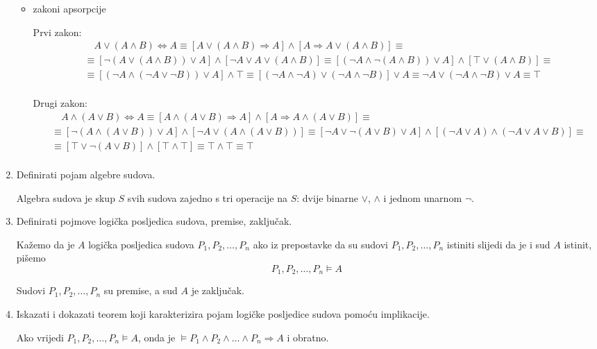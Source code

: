 \documentclass{article}
\begin{document}
\begin{enumerate}
\begin{itemize}
\item zakoni apsorpcije

Prvi zakon:
\begin{align*}
&\quad A\lor(A\land B)\Leftrightarrow A\equiv[A\lor(A\land B)\Rightarrow A]\land[A\Rightarrow A\lor(A\land B)]\equiv\\
&\equiv[\neg(A\lor(A\land B))\lor A]\land[\neg A\lor A\lor (A\land B)]\equiv[(\neg A\land\neg(A\land B))\lor A]\land[\top\lor(A\land B)]\equiv\\
&\equiv[(\neg A\land(\neg A\lor\neg B))\lor A]\land\top\equiv [(\neg A\land\neg A)\lor(\neg A\land\neg B)]\lor A\equiv\neg A\lor(\neg A\land\neg B)\lor A\equiv\top\\
\end{align*}

Drugi zakon:
\begin{align*}
&\quad A\land(A\lor B)\Leftrightarrow A\equiv[A\land(A\lor B)\Rightarrow A]\land[A\Rightarrow A\land(A\lor B)]\equiv\\
&\equiv[\neg(A\land(A\lor B))\lor A]\land[\neg A\lor (A\land (A\lor B))]\equiv[\neg A\lor\neg(A\lor B)\lor A]\land[(\neg A\lor A)\land(\neg A\lor A\lor B)]\equiv\\
&\equiv[\top\lor\neg(A\lor B)]\land[\top\land\top]\equiv\top\land\top\equiv\top\\
\end{align*}

\end{itemize}

\item Definirati pojam algebre sudova.

Algebra sudova je skup $S$ svih sudova zajedno s tri operacije na $S$: dvije binarne $\lor$, $\land$ i jednom unarnom $\neg$.

\item Definirati pojmove logička posljedica sudova, premise, zaključak.

Kažemo da je $A$ logička posljedica sudova $P_1, P_2, \ldots, P_n$ ako iz prepostavke da su sudovi $P_1, P_2, \ldots, P_n$ istiniti slijedi da je i sud $A$ istinit, pišemo
$$P_1, P_2, \ldots, P_n\vDash A$$

Sudovi $P_1, P_2, \ldots, P_n$ su premise, a sud $A$ je zaključak.

\item Iskazati i dokazati teorem koji karakterizira pojam logičke posljedice sudova pomoću implikacije.

Ako vrijedi $P_1, P_2, \ldots, P_n\vDash A$, onda je $\vDash P_1\land P_2\land\ldots\land P_n\Rightarrow A$ i obratno.


\end{enumerate}
\end{document}
